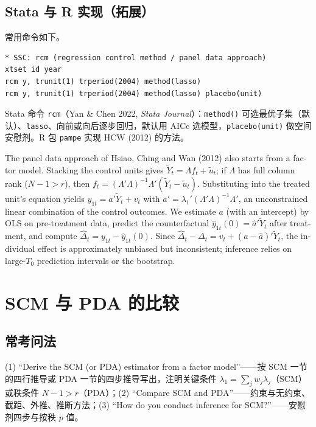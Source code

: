 \subsection{Stata 与 R 实现（拓展）}

常用命令如下。
\begin{lstlisting}
* SSC: rcm (regression control method / panel data approach)
xtset id year
rcm y, trunit(1) trperiod(2004) method(lasso)
rcm y, trunit(1) trperiod(2004) method(lasso) placebo(unit)
\end{lstlisting}
Stata 命令 \texttt{rcm}（Yan \& Chen 2022, \emph{Stata Journal}）：\texttt{method()} 可选最优子集（默认）、\texttt{lasso}、向前或向后逐步回归，默认用 AICc 选模型，\texttt{placebo(unit)} 做空间安慰剂。R 包 \texttt{pampe} 实现 HCW (2012) 的方法。

\begin{english}
The panel data approach of Hsiao, Ching and Wan (2012) also starts from a factor model. Stacking the control units gives $\tilde Y_t=\Lambda f_t+\tilde u_t$; if $\Lambda$ has full column rank ($N-1>r$), then $f_t=(\Lambda'\Lambda)^{-1}\Lambda'(\tilde Y_t-\tilde u_t)$. Substituting into the treated unit's equation yields $y_{1t}=a'\tilde Y_t+v_t$ with $a'=\lambda_1'(\Lambda'\Lambda)^{-1}\Lambda'$, an unconstrained linear combination of the control outcomes. We estimate $a$ (with an intercept) by OLS on pre-treatment data, predict the counterfactual $\hat y_{1t}(0)=\hat a'\tilde Y_t$ after treatment, and compute $\hat\Delta_t=y_{1t}-\hat y_{1t}(0)$. Since $\hat\Delta_t-\Delta_t=v_t+(a-\hat a)'\tilde Y_t$, the individual effect is approximately unbiased but inconsistent; inference relies on large-$T_0$ prediction intervals or the bootstrap.
\end{english}

\section{SCM 与 PDA 的比较}\label{sec:U16-compare}

\subsection{常考问法}

\begin{keypt}[英文试卷常见问法]
(1) “Derive the SCM (or PDA) estimator from a factor model”——按 SCM 一节的四行推导或 PDA 一节的四步推导写出，注明关键条件 $\lambda_1=\sum_jw_j\lambda_j$（SCM）或秩条件 $N-1>r$（PDA）；(2) “Compare SCM and PDA”——约束与无约束、截距、外推、推断方法；(3) “How do you conduct inference for SCM?”——安慰剂四步与按秩 $p$ 值。
\end{keypt}

